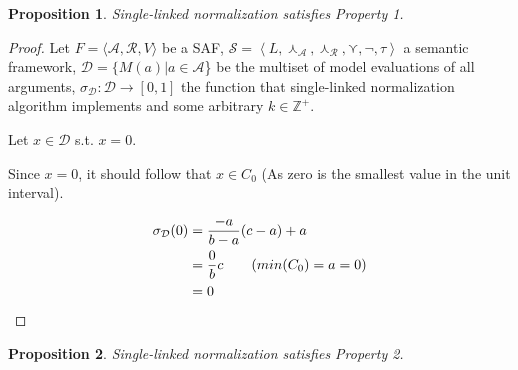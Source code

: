 \documentclass{article}
\newtheorem{proposition}{Proposition}
\newcommand{\real}{\mathbb{R}}  %
\newcommand{\args}{\mathcal{A}} %
\newcommand{\att}{\mathcal{R}}  %
\newcommand{\valueset}{L}
\newcommand{\safid}{F}               %
\newcommand{\saf}{\safid = \safbody} %
\newcommand{\safbody}{\langle \args, \att, V \rangle} %
\newcommand{\sembodyNew}{\left\langle \valueset,\SAFand_\mathcal{A}, \SAFand_\mathcal{R},\SAFor,\lnot,\tau \right\rangle} %
\newcommand{\SAFand}{\curlywedge}     %
\newcommand{\SAFor}{\curlyvee}        %
\newcommand{\sem}{\mathcal{S}}
\newcommand{\dataset}{\mathcal{D}}   %
\begin{document}
\begin{proposition}
Single-linked normalization satisfies Property 1.
\end{proposition}

\begin{proof}
Let $\saf$ be a SAF, $\sem = \sembodyNew$ a semantic framework, $\dataset = \{M(a)|a \in \args$\} be the multiset of model evaluations of all arguments, $\sigma_{\dataset}: \dataset  \rightarrow  [0,1]$ the function that single-linked normalization algorithm implements and some arbitrary $k \in \mathbb{Z}^{+}$. %


Let $x \in \dataset$ s.t. $x = 0$. 

Since $x = 0$, it should follow that $x \in C_0$ (As zero is the smallest value in the unit interval).

\begin{align*}
  \sigma_{\dataset}(0) 
  &= \dfrac{-a}{b-a} (c-a) + a
  \\ &=\dfrac{0}{b} c                   \tag{$min(C_0) = a = 0$}
  \\ &= 0                  \>    \qedhere
\end{align*}
 
\end{proof}

\begin{proposition}
Single-linked normalization satisfies Property 2.
\end{proposition}
\end{document}
